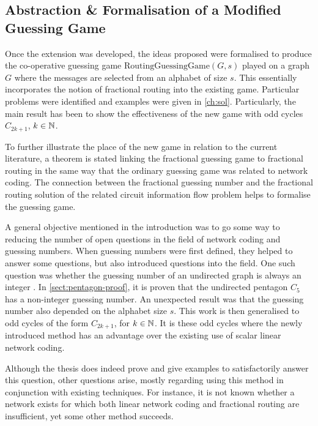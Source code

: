 \newpage

\subsection{Abstraction \& Formalisation of a Modified Guessing Game}

Once the extension was developed, the ideas proposed were formalised to produce the co-operative guessing game $\mathrm{RoutingGuessingGame}(G, s)$ played on a graph $G$ where the messages are selected from an alphabet of size $s$. This essentially incorporates the notion of fractional routing into the existing game. Particular problems were identified and examples were given in \autoref{ch:sol}. Particularly, the main result has been to show the effectiveness of the new game with odd cycles $C_{2k + 1}$, $k \in \mathbb{N}$.

To further illustrate the place of the new game in relation to the current literature, a theorem is stated linking the fractional guessing game to fractional routing in the same way that the ordinary guessing game was related to network coding. The connection between the fractional guessing number and the fractional routing solution of the related circuit information flow problem helps to formalise the guessing game.

A general objective mentioned in the introduction was to go some way to reducing the number of open questions in the field of network coding and guessing numbers. When guessing numbers were first defined, they helped to answer some questions, but also introduced questions into the field. One such question was whether the guessing number of an undirected graph is always an integer \cite{riis2005util}. In \autoref{sect:pentagon-proof}, it is proven that the undirected pentagon $C_5$ has a non-integer guessing number. An unexpected result was that the guessing number also depended on the alphabet size $s$. This work is then generalised to odd cycles of the form $C_{2k + 1}$, for $k \in \mathbb{N}$. It is these odd cycles where the newly introduced method has an advantage over the existing use of scalar linear network coding.

Although the thesis does indeed prove and give examples to satisfactorily answer this question, other questions arise, mostly regarding using this method in conjunction with existing techniques. For instance, it is not known whether a network exists for which both linear network coding and fractional routing are insufficient, yet some other method succeeds.

